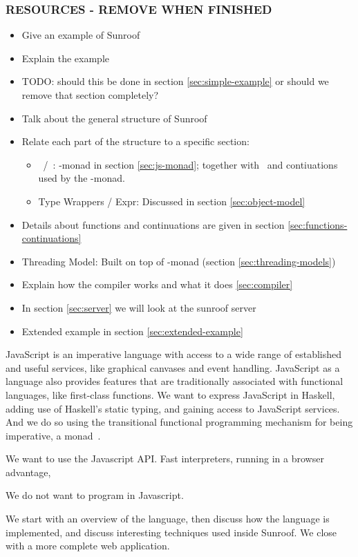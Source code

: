 \subsubsection{RESOURCES - REMOVE WHEN FINISHED}

\begin{itemize}
\item Give an example of Sunroof 
\item Explain the example
\item TODO: should this be done in section \ref{sec:simple-example} or should we remove that section completely?
\item Talk about the general structure of Sunroof
\item Relate each part of the structure to a specific section:
  \begin{itemize}
  \item \JSA\ /\ \JSB: \JS-monad in section \ref{sec:js-monad};
  together with \JSI\ and contiuations used by the \JS-monad.
  \item Type Wrappers / Expr: Discussed in section \ref{sec:object-model}
  \end{itemize}
\item Details about functions and continuations are given in section \ref{sec:functions-continuations}
\item Threading Model: Built on top of \JS-monad (section \ref{sec:threading-models})
\item Explain how the compiler works and what it does \ref{sec:compiler}
\item In section \ref{sec:server} we will look at the sunroof server 
\item Extended example in section \ref{sec:extended-example}
\end{itemize}

JavaScript is an imperative language with access to a wide range
of established and useful services, like graphical canvases and event
handling. JavaScript as a language also provides features that are
traditionally associated with functional languages, like first-class 
functions. We want to express JavaScript in Haskell, adding use
of Haskell's static typing, and gaining access to JavaScript services.
And we do so using the transitional functional programming 
mechanism for being imperative, a monad~\cite{Moggi:91:ComputationMonads}.


We want to use the Javascript API. Fast interpreters,
running in a browser advantage, 

We do not want to program in Javascript.

We start with an overview of the language, then discuss
how the language is implemented, and discuss interesting
techniques used inside Sunroof. We close with a more
complete web application.





